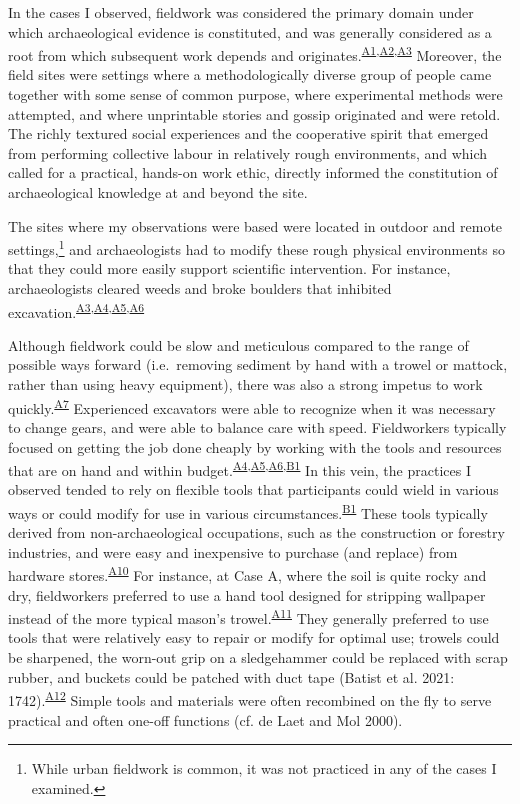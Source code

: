 \documentclass[
]{article}
\begin{document}
In the cases I observed, fieldwork was considered the primary domain
under which archaeological evidence is constituted, and was generally
considered as a root from which subsequent work depends and
originates.\textsuperscript{\hyperref[sec-A1]{A1},\hyperref[sec-A2]{A2},\hyperref[sec-A3]{A3}}
Moreover, the field sites were settings where a methodologically diverse
group of people came together with some sense of common purpose, where
experimental methods were attempted, and where unprintable stories and
gossip originated and were retold. The richly textured social
experiences and the cooperative spirit that emerged from performing
collective labour in relatively rough environments, and which called for
a practical, hands-on work ethic, directly informed the constitution of
archaeological knowledge at and beyond the site.

The sites where my observations were based were located in outdoor and
remote settings,\footnote{While urban fieldwork is common, it was not
  practiced in any of the cases I examined.} and archaeologists had to
modify these rough physical environments so that they could more easily
support scientific intervention. For instance, archaeologists cleared
weeds and broke boulders that inhibited
excavation.\textsuperscript{\hyperref[sec-A3]{A3},\hyperref[sec-A4]{A4},\hyperref[sec-A5]{A5},\hyperref[sec-A6]{A6}}

Although fieldwork could be slow and meticulous compared to the range of
possible ways forward (i.e.~removing sediment by hand with a trowel or
mattock, rather than using heavy equipment), there was also a strong
impetus to work quickly.\textsuperscript{\hyperref[sec-A7]{A7}}
Experienced excavators were able to recognize when it was necessary to
change gears, and were able to balance care with speed. Fieldworkers
typically focused on getting the job done cheaply by working with the
tools and resources that are on hand and within
budget.\textsuperscript{\hyperref[sec-A4]{A4},\hyperref[sec-A8]{A5},\hyperref[sec-A9]{A6},\hyperref[sec-B1]{B1}}
In this vein, the practices I observed tended to rely on flexible tools
that participants could wield in various ways or could modify for use in
various circumstances.\textsuperscript{\hyperref[sec-B1]{B1}} These
tools typically derived from non-archaeological occupations, such as the
construction or forestry industries, and were easy and inexpensive to
purchase (and replace) from hardware
stores.\textsuperscript{\hyperref[sec-A10]{A10}} For instance, at Case
A, where the soil is quite rocky and dry, fieldworkers preferred to use
a hand tool designed for stripping wallpaper instead of the more typical
mason's trowel.\textsuperscript{\hyperref[sec-A11]{A11}} They generally
preferred to use tools that were relatively easy to repair or modify for
optimal use; trowels could be sharpened, the worn-out grip on a
sledgehammer could be replaced with scrap rubber, and buckets could be
patched with duct tape (Batist et al. 2021:
1742).\textsuperscript{\hyperref[sec-A12]{A12}} Simple tools and
materials were often recombined on the fly to serve practical and often
one-off functions (cf. de Laet and Mol 2000).
\end{document}
